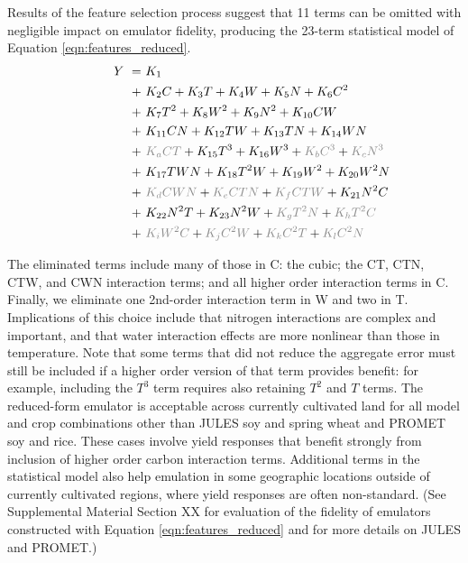 \documentclass[gmd, manuscript]{copernicus} %
\begin{document}
Results of the feature selection process suggest that 11 terms can be omitted with negligible impact on emulator fidelity, producing the 23-term statistical model of Equation \ref{eqn:features_reduced}.
\vspace{-0.2in}
\begin{align}
        \hspace{10mm} \label{eqn:features_reduced}
    Y\ = \ & K_{1}  \\
    + \ & K_{2} C      + K_{3} T       + K_{4} W    + K_{5} N  + K_{6} C^2 \nonumber \\
    + \ & K_{7} T^2    + K_{8} W^2     + K_{9} N^2  + K_{10} C W \nonumber \\
    + \ & K_{11} C N   + K_{12} T W    + K_{13} T N + K_{14} W N \nonumber \\
    + \ & {\color{dark-gray}K_{a} C T} + K_{15} T^3 + K_{16} W^3  + {\color{dark-gray}K_{b} C^3} + {\color{dark-gray}K_{c} N^3}\nonumber \\
    + \ & K_{17} T W N + K_{18} T^2 W  + K_{19} W^2 + K_{20} W^2 N  \nonumber \\
    + \ & {\color{dark-gray}K_{d} C W N} + {\color{dark-gray}K_{e} C T N} + {\color{dark-gray}K_{f} C T W} + K_{21} N^2 C \nonumber \\
    + \ & K_{22} N^2 T + K_{23} N^2 W    + {\color{dark-gray}K_{g} T^2 N} + {\color{dark-gray}K_{h} T^2 C}                 \nonumber \\
    + \ & {\color{dark-gray}K_{i} W^2 C} + {\color{dark-gray}K_{j} C^2 W} + {\color{dark-gray}K_{k} C^2 T} + {\color{dark-gray}K_{l} C^2 N} \nonumber
\end{align}

\noindent The eliminated terms include many of those in C: the cubic; the CT, CTN, CTW, and CWN interaction terms; and all higher order interaction terms in C. 
Finally, we eliminate one 2nd-order interaction term in W and two in T. 
Implications of this choice include that nitrogen interactions are complex and important, and that water interaction effects are more nonlinear than those in temperature.  
Note that some terms that did not reduce the aggregate error must still be included if a higher order version of that term provides benefit: for example, including the $T^3$ term requires also retaining $T^2$ and $T$ terms. 
The reduced-form emulator is acceptable across currently cultivated land for all model and crop combinations other than JULES soy and spring wheat and PROMET soy and rice.
These cases involve yield responses that benefit strongly from inclusion of higher order carbon interaction terms. 
Additional terms in the statistical model also help emulation in some geographic locations outside of currently cultivated regions, where yield responses are often non-standard. 
(See Supplemental Material Section XX for evaluation of the fidelity of emulators constructed with Equation \ref{eqn:features_reduced} and for more details on JULES and PROMET.)
\end{document}
